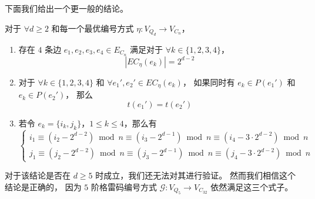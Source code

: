 下面我们给出一个更一般的结论。
\begin{conjecture}
对于 $\forall d \ge 2$ 和每一个最优编号方式 $\eta \colon V_{Q_d} \rightarrow V_{C_n}$，
\begin{enumerate}[(1)]
	\item 存在 $4$ 条边 $e_1, e_2, e_3, e_4 \in E_{C_n}$ 满足对于 $\forall k \in \{1, 2, 3, 4\}$，
		\begin{equation}
		\label{Equation 5-4}
		|EC_\eta(e_k)| = 2^{d - 2}
		\end{equation}
	\item 对于 $\forall k \in \{1, 2, 3, 4\}$
		和 $\forall e_1', e_2' \in EC_\eta(e_k)$，
		如果同时有 $e_k \in P(e_1')$ 和 $e_k \in P(e_2')$，
		那么
		\begin{equation}
		\label{Equation 5-5}
		t(e_1') = t(e_2')
		\end{equation}
	\item 若令 $e_k = \{i_k, j_k\}$，$1 \le k \le 4$，那么有
		\begin{equation}
		\label{Equation 5-6}
		\begin{cases}
		i_1 \equiv (i_2 - 2^{d - 2}) \bmod n \equiv (i_3 - 2^{d - 1}) \bmod n \equiv (i_4 - 3 \cdot 2^{d - 2}) \bmod n \\
		j_1 \equiv (j_2 - 2^{d - 2}) \bmod n \equiv (j_3 - 2^{d - 1}) \bmod n \equiv (j_4 - 3 \cdot 2^{d - 2}) \bmod n
		\end{cases}
		\end{equation}
\end{enumerate}
\end{conjecture}

对于该结论是否在 $d \ge 5$ 时成立，我们还无法对其进行验证。
然而我们相信这个结论是正确的，
因为 $5$ 阶格雷码编号方式 $\mathcal{G} \colon V_{Q_5} \rightarrow V_{C_{32}}$
依然满足这三个式子。
